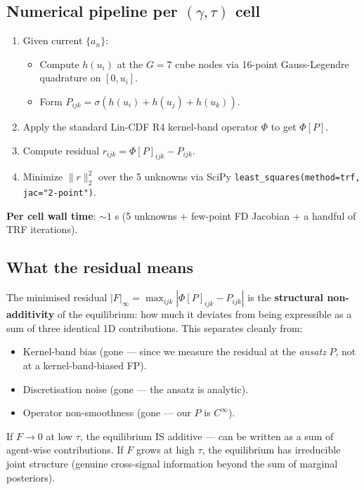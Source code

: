 \documentclass[11pt]{article}
\begin{document}
\subsection{Numerical pipeline per $(\gamma, \tau)$ cell}

\begin{enumerate}
  \item Given current $\{a_n\}$:
  \begin{itemize}
    \item Compute $h(u_i)$ at the $G = 7$ cube nodes via 16-point
          Gauss-Legendre quadrature on $[0, u_i]$.
    \item Form $P_{ijk} = \sigma(h(u_i) + h(u_j) + h(u_k))$.
  \end{itemize}
  \item Apply the standard Lin-CDF R4 kernel-band operator $\Phi$ to get
        $\Phi[P]$.
  \item Compute residual $r_{ijk} = \Phi[P]_{ijk} - P_{ijk}$.
  \item Minimize $\|r\|_2^2$ over the 5 unknowns via SciPy
        \texttt{least\_squares(method=trf, jac="2-point")}.
\end{enumerate}

\textbf{Per cell wall time}: $\sim 1$ s (5 unknowns + few-point FD Jacobian
+ a handful of TRF iterations).

\subsection{What the residual means}

The minimised residual $|F|_\infty = \max_{ijk} |\Phi[P]_{ijk} - P_{ijk}|$
is the \textbf{structural non-additivity} of the equilibrium: how much it
deviates from being expressible as a sum of three identical 1D
contributions. This separates cleanly from:
\begin{itemize}
  \item Kernel-band bias (gone --- since we measure the residual at the
        \emph{ansatz} $P$, not at a kernel-band-biased FP).
  \item Discretisation noise (gone --- the ansatz is analytic).
  \item Operator non-smoothness (gone --- our $P$ is $C^\infty$).
\end{itemize}

If $F \to 0$ at low $\tau$, the equilibrium IS additive --- can be written
as a sum of agent-wise contributions. If $F$ grows at high $\tau$, the
equilibrium has irreducible joint structure (genuine cross-signal
information beyond the sum of marginal posteriors).
\end{document}
